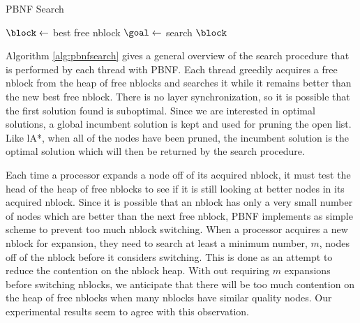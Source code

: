 \documentclass{article}
\begin{document}
\begin{algorithm}
  \caption{PBNF Search}
  \label{alg:pbnfsearch}
   {
    $\block \leftarrow$ best free nblock\;
     {
      $\goal \leftarrow$ search $\block$\;
    }
  }
\end{algorithm}

Algorithm \ref{alg:pbnfsearch} gives a general overview of the search
procedure that is performed by each thread with PBNF.  Each thread
greedily acquires a free nblock from the heap of free nblocks and
searches it while it remains better than the new best free nblock.
There is no layer synchronization, so it is possible that the first
solution found is suboptimal.  Since we are interested in optimal
solutions, a global incumbent solution is kept and used for pruning
the open list.  Like lA*, when all of the nodes have been pruned, the
incumbent solution is the optimal solution which will then be returned
by the search procedure.

Each time a processor expands a node off of its acquired nblock, it
must test the head of the heap of free nblocks to see if it is still
looking at better nodes in its acquired nblock.  Since it is possible
that an nblock has only a very small number of nodes which are better
than the next free nblock, PBNF implements as simple scheme to prevent
too much nblock switching.  When a processor acquires a new nblock for
expansion, they need to search at least a minimum number, $m$, nodes
off of the nblock before it considers switching.  This is done as an
attempt to reduce the contention on the nblock heap.  With out
requiring $m$ expansions before switching nblocks, we anticipate that
there will be too much contention on the heap of free nblocks when
many nblocks have similar quality nodes.  Our experimental results
seem to agree with this observation.
\end{document}
